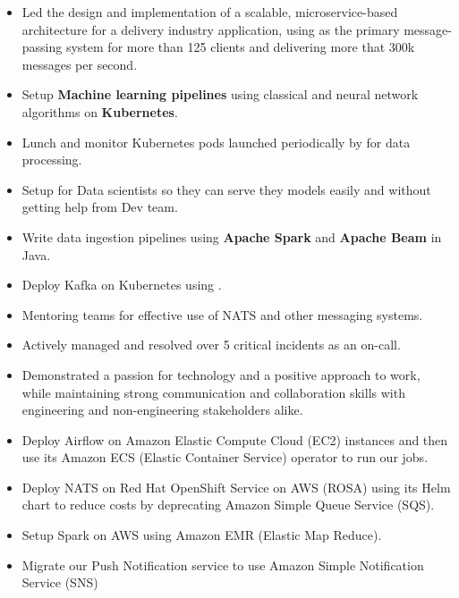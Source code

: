 \begin{itemize}
  \item Led the design and implementation of a scalable, microservice-based architecture for a delivery industry application,
        using  as the primary message-passing system for more than 125 clients and delivering
        more that 300k messages per second.
  \item Setup \textbf{Machine learning pipelines} using classical and neural network algorithms on \textbf{Kubernetes}.
  \item Lunch and monitor Kubernetes pods launched periodically by  for data processing.
  \item Setup  for Data scientists so they can serve they models easily and without getting help from Dev team.
  \item Write data ingestion pipelines using \textbf{Apache Spark} and \textbf{Apache Beam} in Java.
  \item Deploy Kafka on Kubernetes using .
  \item Mentoring teams for effective use of NATS and other messaging systems.
  \item Actively managed and resolved over 5 critical incidents as an on-call.
  \item Demonstrated a passion for technology and a positive approach to work,
        while maintaining strong communication and collaboration skills with engineering
        and non-engineering stakeholders alike.
  \item Deploy Airflow on Amazon Elastic Compute Cloud (EC2) instances and then use its Amazon ECS (Elastic Container Service) operator to run our jobs.
  \item Deploy NATS on Red Hat OpenShift Service on AWS (ROSA)
        using its Helm chart to reduce costs by deprecating Amazon Simple Queue Service (SQS).
  \item Setup Spark on AWS using Amazon EMR (Elastic Map Reduce).
  \item Migrate our Push Notification service to use Amazon Simple Notification Service (SNS)
\end{itemize}

\vspace{0.5cm}

